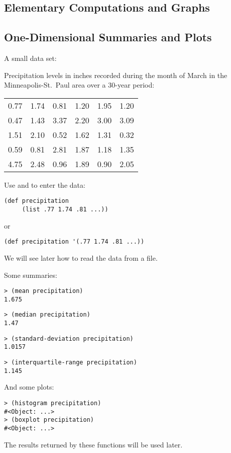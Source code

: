 \begin{slide}{}
\section{Elementary Computations and Graphs}

\subsection{One-Dimensional Summaries and Plots}
A small data set:

Precipitation levels in inches recorded during the
month of March in the Minneapolis-St.~Paul area over a 30-year period:
\begin{center}
\begin{tabular}{rrrrrr}
0.77 & 1.74 & 0.81 & 1.20 & 1.95 & 1.20 \\
0.47 & 1.43 & 3.37 & 2.20 & 3.00 & 3.09 \\
1.51 & 2.10 & 0.52 & 1.62 & 1.31 & 0.32 \\
0.59 & 0.81 & 2.81 & 1.87 & 1.18 & 1.35 \\
4.75 & 2.48 & 0.96 & 1.89 & 0.90 & 2.05 
\end{tabular}
\end{center}
Use  and  to enter the data:
\begin{verbatim}
(def precipitation
     (list .77 1.74 .81 ...))
\end{verbatim}
or
\begin{verbatim}
(def precipitation '(.77 1.74 .81 ...))
\end{verbatim}
We will see later how to read the data from a file.
\end{slide}

\begin{slide}{}
Some summaries:
\begin{verbatim}
> (mean precipitation)
1.675
\end{verbatim}
\begin{verbatim}
> (median precipitation)
1.47
\end{verbatim}
\begin{verbatim}
> (standard-deviation precipitation)
1.0157
\end{verbatim}
\begin{verbatim}
> (interquartile-range precipitation)
1.145
\end{verbatim}

And some plots:
\begin{verbatim}
> (histogram precipitation)
#<Object: ...>
> (boxplot precipitation)
#<Object: ...>
\end{verbatim}
The results returned by these functions will be used later.
\end{slide}

